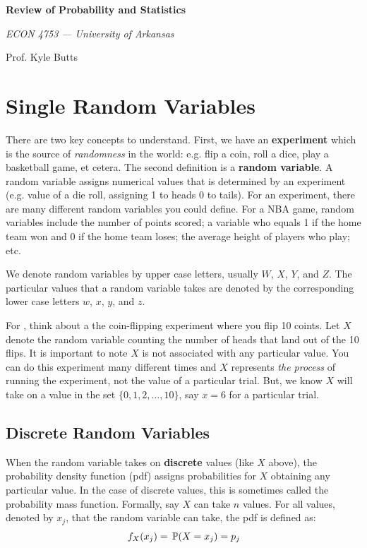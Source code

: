 \documentclass[12pt]{article}
\begin{document}
\begin{center}
  {\Huge\bf Review of Probability and Statistics}
  
  \smallskip
  {\large\it  ECON 4753 — University of Arkansas}

  \medskip
  {\large Prof. Kyle Butts}
\end{center}

\section{Single Random Variables}

There are two key concepts to understand. First, we have an \textbf{experiment} which is the source of \emph{randomness} in the world: e.g. flip a coin, roll a dice, play a basketball game, et cetera. The second definition is a \textbf{random variable}. A random variable assigns numerical values that is determined by an experiment (e.g. value of a die roll, assigning 1 to heads 0 to tails). For an experiment, there are many different random variables you could define. For a NBA game, random variables include the number of points scored; a variable who equals 1 if the home team won and 0 if the home team loses; the average height of players who play; etc. 

We denote random variables by upper case letters, usually $W$, $X$, $Y$,
and $Z$. The particular values that a random variable takes are denoted by the corresponding lower case letters $w$, $x$, $y$, and $z$.

For , think about a the coin-flipping experiment where you flip 10 coints. Let $X$ denote the random variable counting the number of heads that land out of the 10 flips. It is important to note $X$ is not associated with any particular value. You can do this experiment many different times and $X$ represents \emph{the process} of running the experiment, not the value of a particular trial. But, we know $X$ will take on a value in the set $\{ 0, 1, 2, \dots, 10 \}$, say $x = 6$ for a particular trial.


\subsection*{Discrete Random Variables}

When the random variable takes on \textbf{discrete} values (like $X$ above), the probability density function (pdf) assigns probabilities for $X$ obtaining any particular value. In the case of discrete values, this is sometimes called the probability mass function. Formally, say $X$ can take $n$ values. For all values, denoted by $x_j$, that the random variable can take, the pdf is defined as:
$$
  f_{X}(x_j) = \P{X = x_j} = p_j
$$
\end{document}
